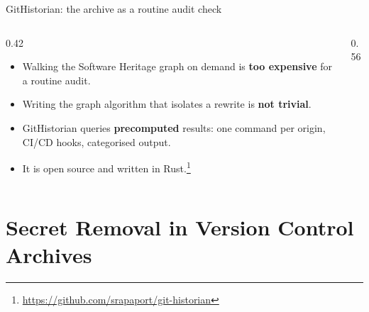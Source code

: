 \documentclass[aspectratio=169]{beamer}
\newcommand{\sidefigbegin}{%
  \hspace*{-14mm}%
  \begin{minipage}{\dimexpr\textwidth+14mm\relax}%
  \setlength{\leftmargini}{0.9em}%
}
\newcommand{\sidefigend}{\end{minipage}}
\newcommand{\GitOriginsRootCauseCommitsShort}{\num{1.22}\,M\xspace}
\newcommand{\BranchMain}{\num{11.4}\%\xspace}
\begin{document}
\begin{frame}[fragile]{GitHistorian: the archive as a routine audit check}
    \sidefigbegin
    \begin{columns}[T,totalwidth=\textwidth]
        \begin{column}{0.42\textwidth}
            
            \begin{itemize}\setlength{\itemsep}{0.55em}
                \item Walking the Software Heritage graph on demand is
                      \textbf{too expensive} for a routine audit.
                \item Writing the graph algorithm that isolates a rewrite is
                      \textbf{not trivial}.
                \item GitHistorian queries \textbf{precomputed} results:
                      one command per origin, CI/CD hooks, categorised output.
                \item It is open source and written in Rust.\footnote[frame]{\url{https://github.com/srapaport/git-historian}}
            \end{itemize}
        \end{column}
        \begin{column}{0.56\textwidth}
        \end{column}
    \end{columns}
    \sidefigend
\end{frame}


\section{Secret Removal in Version Control Archives}
\end{document}
